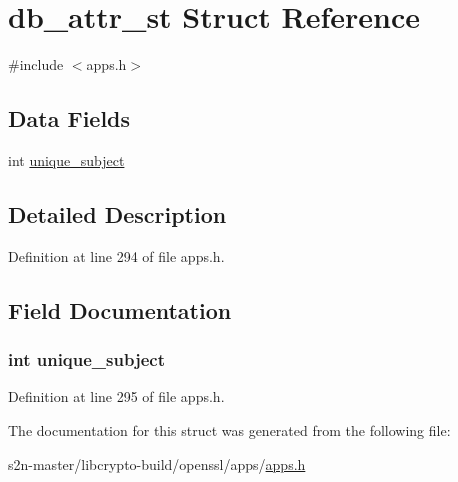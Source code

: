 \hypertarget{structdb__attr__st}{}\section{db\+\_\+attr\+\_\+st Struct Reference}
\label{structdb__attr__st}


{\ttfamily \#include $<$apps.\+h$>$}

\subsection*{Data Fields}
\begin{DoxyCompactItemize}
\item 
int \hyperlink{structdb__attr__st_a7323683dbfff932d0043cacc7d4fe8b4}{unique\+\_\+subject}
\end{DoxyCompactItemize}


\subsection{Detailed Description}


Definition at line 294 of file apps.\+h.



\subsection{Field Documentation}
\subsubsection[{\texorpdfstring{unique\+\_\+subject}{unique_subject}}]{\setlength{\rightskip}{0pt plus 5cm}int unique\+\_\+subject}\hypertarget{structdb__attr__st_a7323683dbfff932d0043cacc7d4fe8b4}{}\label{structdb__attr__st_a7323683dbfff932d0043cacc7d4fe8b4}


Definition at line 295 of file apps.\+h.



The documentation for this struct was generated from the following file\+:\begin{DoxyCompactItemize}
\item 
s2n-\/master/libcrypto-\/build/openssl/apps/\hyperlink{apps_8h}{apps.\+h}\end{DoxyCompactItemize}
